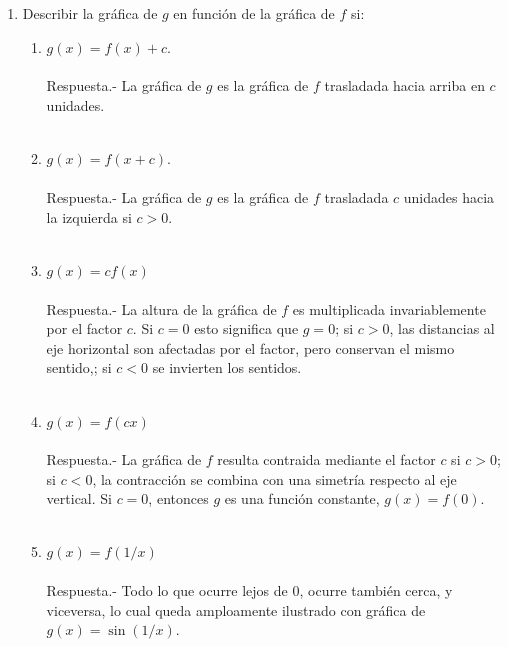 \begin{enumerate}[\bfseries 1.]
\begin{enumerate}[\bfseries (a)]
    \end{enumerate}

    \item Describir la gráfica de $g$ en función de la gráfica de $f$ si:
    \begin{enumerate}[\bfseries (i)]

	\item $g(x)=f(x)+c.$\\\\
	    Respuesta.-\; La gráfica de $g$ es la gráfica de $f$ trasladada hacia arriba en $c$ unidades.\\\\

	\item $g(x)=f(x+c)$.\\\\
	    Respuesta.-\; La gráfica de $g$ es la gráfica de $f$ trasladada $c$ unidades hacia la izquierda si $c>0$.\\\\

	\item $g(x)=cf(x)$\\\\
	    Respuesta.-\; La altura de la gráfica de $f$ es multiplicada invariablemente por el factor $c$. Si $c=0$ esto significa que $g=0$; si $c>0$, las distancias al eje horizontal son afectadas por el factor, pero conservan el mismo sentido,; si $c<0$ se invierten los sentidos.\\\\

	\item $g(x)=f(cx)$\\\\
	    Respuesta.-\; La gráfica de $f$ resulta contraida mediante el factor $c$ si $c>0$; si $c<0$, la contracción se combina con una simetría respecto al eje vertical. Si $c=0$, entonces $g$ es una función constante, $g(x)=f(0)$.\\\\

	\item $g(x)=f(1/x)$\\\\
	    Respuesta.-\; Todo lo que ocurre lejos de $0$, ocurre también cerca, y viceversa, lo cual queda amploamente ilustrado con gráfica de $g(x)=\sin (1/x)$.\\\\


\end{enumerate}
\end{enumerate}
